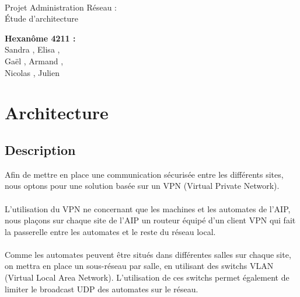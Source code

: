 \documentclass[a4paper]{article}
\begin{document}
\begin{titlepage}
	~ 
	\vfill
	\begin{center}
		\begin{Huge}
			Projet Administration Réseau : \\ Étude d'architecture\\
		\end{Huge}
	\vfill
		\textbf{Hexanôme 4211 :} 
			\\Sandra {}, Elisa , 
			\\Gaël , Armand , 
			\\Nicolas {}, Julien \\
	\vfill
	\end{center}
	\vfill
\end{titlepage}

\newpage

\section{Architecture}

	\subsection{Description} %
	
	Afin de mettre en place une communication sécurisée entre les différents sites, nous optons pour une solution basée sur un VPN (Virtual Private Network). 
	
	\paragraph*{} %
	L'utilisation du VPN ne concernant que les machines et les automates de l'AIP, nous plaçons sur chaque site de l'AIP un routeur équipé d'un client VPN qui fait la passerelle entre les automates et le reste du réseau local. 
	
	\paragraph*{} %
	Comme les automates peuvent être situés dans différentes salles sur chaque site, on mettra en place un sous-réseau par salle, en utilisant des switchs VLAN (Virtual Local Area Network). L'utilisation de ces switchs permet également de limiter le broadcast UDP des automates sur le réseau. 
	
\end{document}
